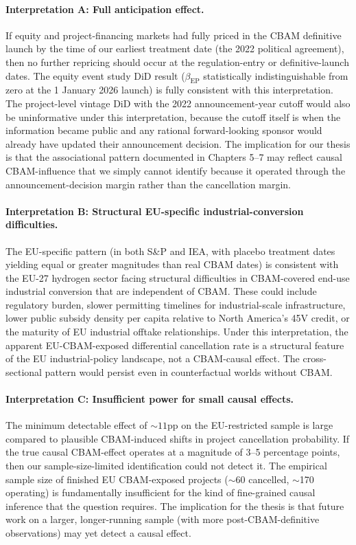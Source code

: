 \documentclass[11pt,a4paper]{article}
\newcommand{\bep}{\beta_{\mathrm{EP}}}
\begin{document}
\paragraph{Interpretation A: Full anticipation effect.}
If equity and project-financing markets had fully priced in the CBAM definitive launch by the time of our earliest treatment date (the 2022 political agreement), then no further repricing should occur at the regulation-entry or definitive-launch dates. The equity event study DiD result ($\bep$ statistically indistinguishable from zero at the 1 January 2026 launch) is fully consistent with this interpretation. The project-level vintage DiD with the 2022 announcement-year cutoff would also be uninformative under this interpretation, because the cutoff itself is when the information became public and any rational forward-looking sponsor would already have updated their announcement decision. The implication for our thesis is that the associational pattern documented in Chapters 5--7 may reflect causal CBAM-influence that we simply cannot identify because it operated through the announcement-decision margin rather than the cancellation margin.

\paragraph{Interpretation B: Structural EU-specific industrial-conversion difficulties.}
The EU-specific pattern (in both S\&P and IEA, with placebo treatment dates yielding equal or greater magnitudes than real CBAM dates) is consistent with the EU-27 hydrogen sector facing structural difficulties in CBAM-covered end-use industrial conversion that are independent of CBAM. These could include regulatory burden, slower permitting timelines for industrial-scale infrastructure, lower public subsidy density per capita relative to North America's 45V credit, or the maturity of EU industrial offtake relationships. Under this interpretation, the apparent EU-CBAM-exposed differential cancellation rate is a structural feature of the EU industrial-policy landscape, not a CBAM-causal effect. The cross-sectional pattern would persist even in counterfactual worlds without CBAM.

\paragraph{Interpretation C: Insufficient power for small causal effects.}
The minimum detectable effect of $\sim 11$pp on the EU-restricted sample is large compared to plausible CBAM-induced shifts in project cancellation probability. If the true causal CBAM-effect operates at a magnitude of 3--5 percentage points, then our sample-size-limited identification could not detect it. The empirical sample size of finished EU CBAM-exposed projects ($\sim$60 cancelled, $\sim$170 operating) is fundamentally insufficient for the kind of fine-grained causal inference that the question requires. The implication for the thesis is that future work on a larger, longer-running sample (with more post-CBAM-definitive observations) may yet detect a causal effect.
\end{document}
